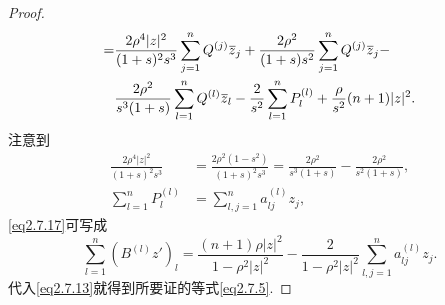 \begin{proof}
\begin{align}
	=&\frac{2\rho^4|z|^2}{(1+s)^2s^3}\sum_{j=1}^{n}Q^{(j)}\bar{z}_j+\frac{2\rho^2}{(1+s)s^2}\sum_{j=1}^{n}Q^{(j)}\bar{z}_j-\notag\\
	&\frac{2\rho^2}{s^3(1+s)}\sum_{l=1}^{n}Q^{(l)}\bar{z}_l-\frac{2}{s^2}\sum_{l=1}^{n}P_l^{(l)}+\frac{\rho}{s^2}(n+1)|z|^2.
\end{align}
注意到
\begin{align*}
	\frac{2\rho^4|z|^2}{(1+s)^2 s^3}
	&=\frac{2\rho^2(1-s^2)}{(1+s)^2s^3}=\frac{2\rho^2}{s^3(1+s)}-\frac{2\rho^2}{s^2(1+s)},\\
	\sum_{l=1}^{n}P_l^{(l)}
	&=\sum_{l,j=1}^{n}a_{lj}^{(l)}z_j,
\end{align*}
\eqref{eq2.7.17}可写成
\[\sum_{l=1}^{n}(B^{(l)}z')_l=\frac{(n+1)\rho|z|^2}{1-\rho^2|z|^2}-\frac{2}{1-\rho^2|z|^2}\sum_{l,j=1}^{n}a_{lj}^{(l)}z_j.\]
代入\eqref{eq2.7.13}就得到所要证的等式\eqref{eq2.7.5}.
\end{proof}
